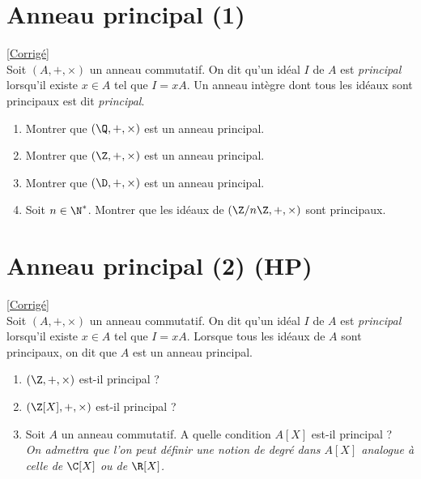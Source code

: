 \documentclass[8pt]{book}
\begin{document}
	\section{Anneau principal (1) }
	\label{Anneau principal (1)}
	\textcolor{blue}{\hyperref[Anneau principal (1) corrigé]{[Corrigé]}}\\
	Soit $(A,+,\times)$ un anneau commutatif. On dit qu'un idéal $I$ de $A$ est \textit{principal} lorsqu'il existe $x\in A$ tel que $I=xA$. Un anneau intègre dont tous les idéaux sont principaux est dit \textit{principal}.
	\begin{enumerate}
		\item Montrer que $(\Q,+,\times)$ est un anneau principal.
		\item Montrer que $(\Z,+,\times)$ est un anneau principal.
		\item Montrer que $(\D,+,\times)$ est un anneau principal.
		\item Soit $n\in \N^*$. Montrer que les idéaux de $(\Z/n\Z,+,\times)$ sont principaux.
	\end{enumerate}
	
	\section{Anneau principal (2)  (HP)}
	\label{Anneau principal (2)}
	\textcolor{blue}{\hyperref[Anneau principal (2) corrigé]{[Corrigé]}}\\
	Soit $(A,+,\times)$ un anneau commutatif. On dit qu'un idéal $I$ de $A$ est \textit{principal} lorsqu'il existe $x\in A$ tel que $I=xA$. Lorsque tous les idéaux de $A$ sont principaux, on dit que $A$ est un anneau principal.
	\begin{enumerate}
		\item $(\Z,+,\times)$ est-il principal ?
		\item $(\Z[X],+,\times)$ est-il principal ?
		\item Soit $A$ un anneau commutatif. A quelle condition $A[X]$ est-il principal ?\\
		\textit{On admettra que l'on peut définir une notion de degré dans $A[X]$ analogue à celle de $\C[X]$ ou de $\R[X]$.}
	\end{enumerate}
	
\end{document}
